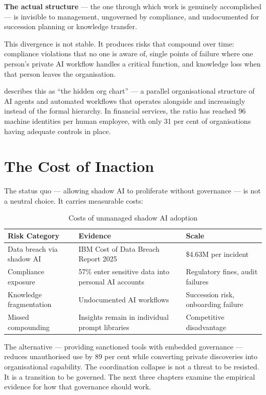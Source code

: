 \textbf{The actual structure} --- the one through which work is genuinely accomplished --- is invisible to management, ungoverned by compliance, and undocumented for succession planning or knowledge transfer.

This divergence is not stable. It produces risks that compound over time: compliance violations that no one is aware of, single points of failure where one person's private AI workflow handles a critical function, and knowledge loss when that person leaves the organisation.

\textcite{CyberArk2025} describes this as ``the hidden org chart'' --- a parallel organisational structure of AI agents and automated workflows that operates alongside and increasingly instead of the formal hierarchy. In financial services, the ratio has reached 96 machine identities per human employee, with only 31 per cent of organisations having adequate controls in place.

\section{The Cost of Inaction}

The status quo --- allowing shadow AI to proliferate without governance --- is not a neutral choice. It carries measurable costs:

\begin{table}[h]
\centering
\caption{Costs of unmanaged shadow AI adoption}
\label{tab:shadow-ai-costs}
\begin{tabularx}{\textwidth}{L{4cm}L{5cm}X}
\toprule
\textbf{Risk Category} & \textbf{Evidence} & \textbf{Scale} \\
\midrule
Data breach via shadow AI & IBM Cost of Data Breach Report 2025 & \$4.63M per incident \\
Compliance exposure & 57\% enter sensitive data into personal AI accounts & Regulatory fines, audit failures \\
Knowledge fragmentation & Undocumented AI workflows & Succession risk, onboarding failure \\
Missed compounding & Insights remain in individual prompt libraries & Competitive disadvantage \\
\bottomrule
\end{tabularx}
\end{table}

The alternative --- providing sanctioned tools with embedded governance --- reduces unauthorised use by 89 per cent while converting private discoveries into organisational capability. The coordination collapse is not a threat to be resisted. It is a transition to be governed. The next three chapters examine the empirical evidence for how that governance should work.
